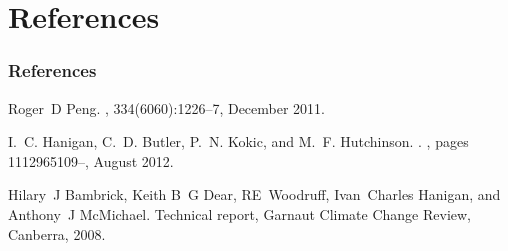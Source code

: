 \documentclass[bigger]{beamer}
\begin{document}
\section{References}
\label{sec-7}
\begin{frame}
\frametitle{References}
\label{sec-7-1}

\begin{footnotesize}
\begin{thebibliography}{1}

Roger~D Peng.
, 334(6060):1226--7, December 2011.

I.~C. Hanigan, C.~D. Butler, P.~N. Kokic, and M.~F. Hutchinson.
.
, pages
  1112965109--, August 2012.

Hilary~J Bambrick, Keith B~G Dear, RE~Woodruff, Ivan~Charles Hanigan, and
  Anthony~J McMichael.
\newblock Technical report, Garnaut Climate Change Review, Canberra, 2008.

\end{thebibliography}
\end{footnotesize}
\end{frame}
\end{document}
